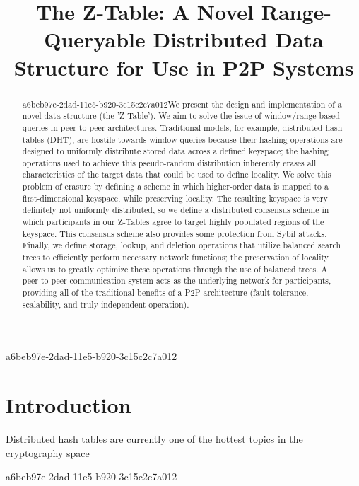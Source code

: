 \documentclass[12pt]{article}
\title{The Z-Table: A Novel Range-Queryable Distributed Data Structure for Use in P2P Systems}
\begin{document}
\maketitle

\begin{abstract}
a6beb97e-2dad-11e5-b920-3c15c2c7a012We present the design and implementation of a novel data structure (the 'Z-Table'). We aim to solve the issue of window/range-based queries in peer to peer architectures. Traditional models, for example,  distributed hash tables (DHT), are hostile towards window queries because their hashing operations are designed to uniformly distribute stored data across a defined keyspace; the hashing operations used to achieve this pseudo-random distribution inherently erases all characteristics of the target data that could be used to define locality. We solve this problem of erasure by defining a scheme in which higher-order data is mapped to a first-dimensional keyspace, while preserving locality. The resulting keyspace is very definitely not uniformly distributed, so we define a distributed consensus scheme in which participants in our Z-Tables agree to target highly populated regions of the keyspace. This consensus scheme also provides some protection from Sybil attacks. Finally, we define storage, lookup, and deletion operations that utilize balanced search trees to efficiently perform necessary network functions; the preservation of locality allows us to greatly optimize these operations through the use of balanced trees. A peer to peer communication system acts as the underlying network for participants, providing all of the traditional benefits of a P2P architecture (fault tolerance, scalability, and truly independent operation).
\end{abstract}
a6beb97e-2dad-11e5-b920-3c15c2c7a012

\newpage
\section{Introduction}
Distributed hash tables are currently one of the hottest topics in the cryptography space~\cite{Stoica:2001dj,Rowstron:2001ea,Ratnasamy:2001wn}

a6beb97e-2dad-11e5-b920-3c15c2c7a012\printbibliography
\end{document}
